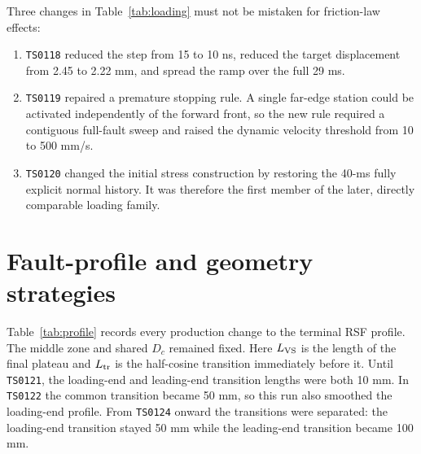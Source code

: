\documentclass[11pt]{article}
\newcommand{\run}[1]{\texttt{TS#1}}
\begin{document}
Three changes in Table~\ref{tab:loading} must not be mistaken for friction-law
effects:
\begin{enumerate}
  \item \run{0118} reduced the step from 15 to 10 ns, reduced the target
  displacement from 2.45 to 2.22 mm, and spread the ramp over the full 29 ms.
  \item \run{0119} repaired a premature stopping rule.  A single far-edge
  station could be activated independently of the forward front, so the new
  rule required a contiguous full-fault sweep and raised the dynamic velocity
  threshold from 10 to 500 mm/s.
  \item \run{0120} changed the initial stress construction by restoring the
  40-ms fully explicit normal history.  It was therefore the first member of
  the later, directly comparable loading family.
\end{enumerate}

\section{Fault-profile and geometry strategies}

Table~\ref{tab:profile} records every production change to the terminal RSF
profile.  The middle zone and shared $D_c$ remained fixed.  Here $L_{\rm VS}$
is the length of the final plateau and $L_{\rm tr}$ is the half-cosine
transition immediately before it.  Until \run{0121}, the loading-end and
leading-end transition lengths were both 10 mm.  In \run{0122} the common
transition became 50 mm, so this run also smoothed the loading-end profile.
From \run{0124} onward the transitions were separated: the loading-end
transition stayed 50 mm while the leading-end transition became 100 mm.
\end{document}

